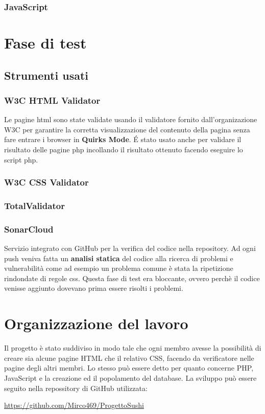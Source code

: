 \documentclass{article}
\begin{document}
			\subsubsection{JavaScript}
	\section{Fase di test}
		\subsection{Strumenti usati}
			\subsubsection{W3C HTML Validator}
				Le pagine html sono state validate usando il validatore fornito dall'organizazione W3C per garantire la corretta visualizzazione del contenuto della pagina senza fare entrare i browser in {\bfseries Quirks Mode}. \'E stato usato anche per validare il risultato delle pagine php incollando il risultato ottenuto facendo eseguire lo script php.
			\subsubsection{W3C CSS Validator}
			\subsubsection{TotalValidator}
			\subsubsection{SonarCloud}
				Servizio integrato con GitHub per la verifica del codice nella repository. Ad ogni push veniva fatta un {\bfseries analisi statica} del codice alla ricerca di problemi e vulnerabilità come ad esempio un problema comune è stata la ripetizione rindondate di regole css. Questa fase di test era bloccante, ovvero perchè il codice venisse aggiunto dovevano prima essere risolti i problemi.
	\section{Organizzazione del lavoro}
		Il progetto è stato suddiviso in modo tale che ogni membro avesse la possibilità di creare sia alcune pagine HTML che il relativo CSS, facendo da verificatore nelle pagine degli altri membri.
		Lo stesso può essere detto per quanto concerne PHP, JavaScript e la creazione ed il popolamento del database.
		La sviluppo può essere seguito nella repossitory di GitHub utilizzata:
		\newline
		\newline
		\centerline{ \url{https://github.com/Mirco469/ProgettoSushi}}
\end{document}
